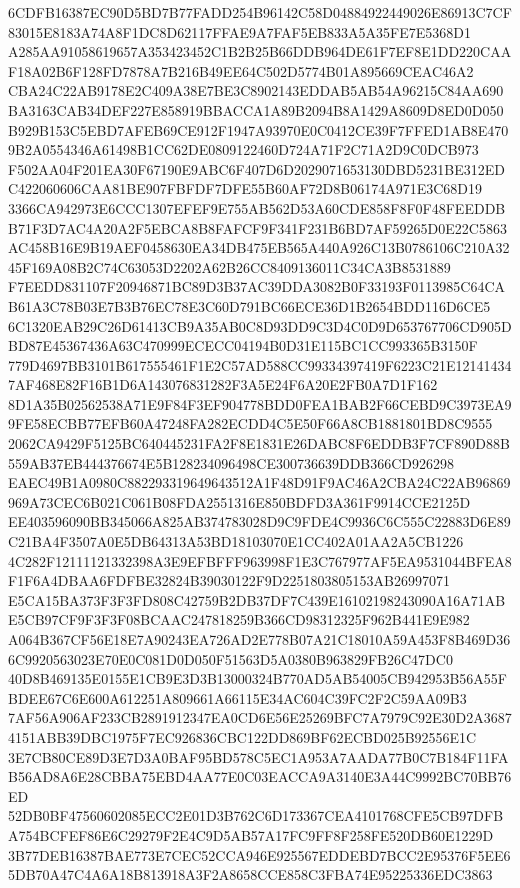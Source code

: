 \documentclass[UTF8,fontset=fandol,zihao=-4,a4paper]{ctexart}
\begin{document}
{{6CDFB16387EC90D5BD7B77FADD254B96142C58D04884922449026E86913C7CF83015E8183A74A8F1DC8D62117FFAE9A7FAF5EB833A5A35FE7E5368D1
A285AA91058619657A353423452C1B2B25B66DDB964DE61F7EF8E1DD220CAAF18A02B6F128FD7878A7B216B49EE64C502D5774B01A895669CEAC46A2
CBA24C22AB9178E2C409A38E7BE3C8902143EDDAB5AB54A96215C84AA690BA3163CAB34DEF227E858919BBACCA1A89B2094B8A1429A8609D8ED0D050
B929B153C5EBD7AFEB69CE912F1947A93970E0C0412CE39F7FFED1AB8E4709B2A0554346A61498B1CC62DE0809122460D724A71F2C71A2D9C0DCB973
F502AA04F201EA30F67190E9ABC6F407D6D2029071653130DBD5231BE312EDC422060606CAA81BE907FBFDF7DFE55B60AF72D8B06174A971E3C68D19
3366CA942973E6CCC1307EFEF9E755AB562D53A60CDE858F8F0F48FEEDDBB71F3D7AC4A20A2F5EBCA8B8FAFCF9F341F231B6BD7AF59265D0E22C5863
AC458B16E9B19AEF0458630EA34DB475EB565A440A926C13B0786106C210A3245F169A08B2C74C63053D2202A62B26CC8409136011C34CA3B8531889
F7EEDD831107F20946871BC89D3B37AC39DDA3082B0F33193F0113985C64CAB61A3C78B03E7B3B76EC78E3C60D791BC66ECE36D1B2654BDD116D6CE5
6C1320EAB29C26D61413CB9A35AB0C8D93DD9C3D4C0D9D653767706CD905DBD87E45367436A63C470999ECECC04194B0D31E115BC1CC993365B3150F
779D4697BB3101B617555461F1E2C57AD588CC99334397419F6223C21E121414347AF468E82F16B1D6A143076831282F3A5E24F6A20E2FB0A7D1F162
8D1A35B02562538A71E9F84F3EF904778BDD0FEA1BAB2F66CEBD9C3973EA99FE58ECBB77EFB60A47248FA282ECDD4C5E50F66A8CB1881801BD8C9555
2062CA9429F5125BC640445231FA2F8E1831E26DABC8F6EDDB3F7CF890D88B559AB37EB444376674E5B128234096498CE300736639DDB366CD926298
EAEC49B1A0980C882293319649643512A1F48D91F9AC46A2CBA24C22AB96869969A73CEC6B021C061B08FDA2551316E850BDFD3A361F9914CCE2125D
EE403596090BB345066A825AB374783028D9C9FDE4C9936C6C555C22883D6E89C21BA4F3507A0E5DB64313A53BD18103070E1CC402A01AA2A5CB1226
4C282F12111121332398A3E9EFBFFF963998F1E3C767977AF5EA9531044BFEA8F1F6A4DBAA6FDFBE32824B39030122F9D2251803805153AB26997071
E5CA15BA373F3F3FD808C42759B2DB37DF7C439E16102198243090A16A71ABE5CB97CF9F3F3F08BCAAC247818259B366CD98312325F962B441E9E982
A064B367CF56E18E7A90243EA726AD2E778B07A21C18010A59A453F8B469D366C9920563023E70E0C081D0D050F51563D5A0380B963829FB26C47DC0
40D8B469135E0155E1CB9E3D3B13000324B770AD5AB54005CB942953B56A55FBDEE67C6E600A612251A809661A66115E34AC604C39FC2F2C59AA09B3
7AF56A906AF233CB2891912347EA0CD6E56E25269BFC7A7979C92E30D2A36874151ABB39DBC1975F7EC926836CBC122DD869BF62ECBD025B92556E1C
3E7CB80CE89D3E7D3A0BAF95BD578C5EC1A953A7AADA77B0C7B184F11FAB56AD8A6E28CBBA75EBD4AA77E0C03EACCA9A3140E3A44C9992BC70BB76ED
52DB0BF47560602085ECC2E01D3B762C6D173367CEA4101768CFE5CB97DFBA754BCFEF86E6C29279F2E4C9D5AB57A17FC9FF8F258FE520DB60E1229D
3B77DEB16387BAE773E7CEC52CCA946E925567EDDEBD7BCC2E95376F5EE65DB70A47C4A6A18B813918A3F2A8658CCE858C3FBA74E95225336EDC3863
}}
\end{document}
